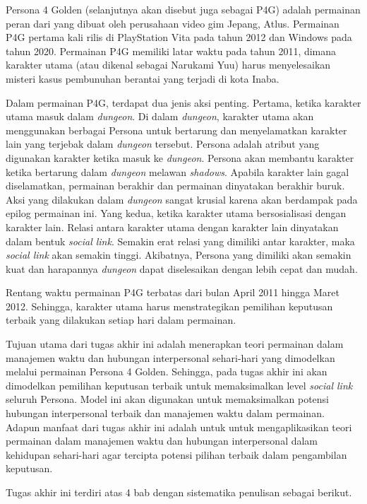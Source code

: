 Persona 4 Golden (selanjutnya akan disebut juga sebagai P4G) adalah permainan peran dari yang dibuat oleh perusahaan video gim Jepang, Atlus. Permainan P4G pertama kali rilis di PlayStation Vita pada tahun 2012 dan Windows pada tahun 2020. Permainan P4G memiliki latar waktu pada tahun 2011, dimana karakter utama (atau dikenal sebagai Narukami Yuu) harus menyelesaikan misteri kasus pembunuhan berantai yang terjadi di kota Inaba.

Dalam permainan P4G, terdapat dua jenis aksi penting. Pertama, ketika karakter utama masuk dalam \textit{dungeon}. Di dalam \textit{dungeon}, karakter utama akan menggunakan berbagai Persona untuk bertarung dan menyelamatkan karakter lain yang terjebak dalam \textit{dungeon} tersebut. Persona adalah atribut yang digunakan karakter ketika masuk ke \textit{dungeon}. Persona akan membantu karakter ketika bertarung dalam \textit{dungeon} melawan \textit{shadows}. Apabila karakter lain gagal diselamatkan, permainan berakhir dan permainan dinyatakan berakhir buruk. Aksi yang dilakukan dalam \textit{dungeon} sangat krusial karena akan berdampak pada epilog permainan ini. Yang kedua, ketika karakter utama bersosialisasi dengan karakter lain. Relasi antara karakter utama dengan karakter lain dinyatakan dalam bentuk \textit{social link}. Semakin erat relasi yang dimiliki antar karakter, maka \textit{social link} akan semakin tinggi. Akibatnya, Persona yang dimiliki akan semakin kuat dan harapannya \textit{dungeon} dapat diselesaikan dengan lebih cepat dan mudah.

Rentang waktu permainan P4G terbatas dari bulan April 2011 hingga Maret 2012. Sehingga, karakter utama harus menstrategikan pemilihan keputusan terbaik yang dilakukan setiap hari dalam permainan.


Tujuan utama dari tugas akhir ini adalah menerapkan teori permainan dalam manajemen waktu dan hubungan interpersonal sehari-hari yang dimodelkan melalui permainan Persona 4 Golden. Sehingga, pada tugas akhir ini akan dimodelkan pemilihan keputusan terbaik untuk memaksimalkan level \textit{social link} seluruh Persona. Model ini akan digunakan untuk memaksimalkan potensi hubungan interpersonal terbaik dan manajemen waktu dalam permainan. Adapun manfaat dari tugas akhir ini adalah untuk untuk mengaplikasikan teori permainan dalam manajemen waktu dan hubungan interpersonal dalam kehidupan sehari-hari agar tercipta potensi pilihan terbaik dalam pengambilan keputusan.

Tugas akhir ini terdiri atas 4 bab dengan sistematika penulisan sebagai berikut.

